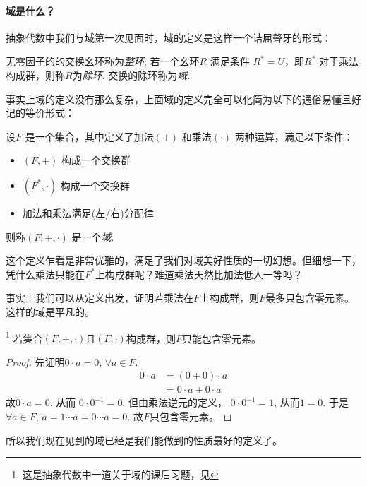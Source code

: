 \paragraph{域是什么？}

抽象代数中我们与域第一次见面时，域的定义是这样一个诘屈聱牙的形式：
\begin{definition}
    无零因子的的交换幺环称为\emph{整环}; 若一个幺环\(R\) 满足条件
    \(R^{*}=U\)，即\(R^{*}\) 对于乘法构成群，则称\(R\)为\emph{除环}. 交换的除环称为\emph{域}.
\end{definition}
事实上域的定义没有那么复杂，上面域的定义完全可以化简为以下的通俗易懂且好记的等价形式：
\begin{definition}
    设\(F\) 是一个集合，其中定义了加法\((+)\) 和乘法\((\cdot)\) 两种运算，满足以下条件：
    \begin{itemize}
        \item \((F, +)\) 构成一个交换群
        \item \((F^{*}, \cdot)\) 构成一个交换群
        \item 加法和乘法满足(左/右)分配律
    \end{itemize}
    则称\((F, +, \cdot)\) 是一个\emph{域}.
\end{definition}

这个定义乍看是非常优雅的，满足了我们对域美好性质的一切幻想。但细想一下，凭什么乘法只能在\(F^{*}\)上构成群呢？难道乘法天然比加法低人一等吗？

事实上我们可以从定义出发，证明若乘法在\(F\)上构成群，则\(F\)最多只包含零元素。这样的域是平凡的。

\begin{theorem}\footnote{这是抽象代数中一道关于域的课后习题，见}
    若集合\((F, +, \cdot)\)且\((F,\cdot)\)构成群，则\(F\)只能包含零元素。
\end{theorem}
\begin{proof}
    先证明\(0 \cdot a=0\), \(\forall a \in F\).
    \begin{align*}
        0 \cdot a &= (0+0) \cdot a\\
        &= 0 \cdot a + 0 \cdot a
    \end{align*}
    故\(0 \cdot a=0\). 从而 \(0\cdot 0^{-1}=0\).
    但由乘法逆元的定义， \(0 \cdot 0^{-1}=1\), 从而\(1=0\).
    于是\(\forall a \in F\), \(a=1 \cdots a=0 \cdots a=0\).
    故\(F\)只包含零元素。
\end{proof}

所以我们现在见到的域已经是我们能做到的性质最好的定义了。

